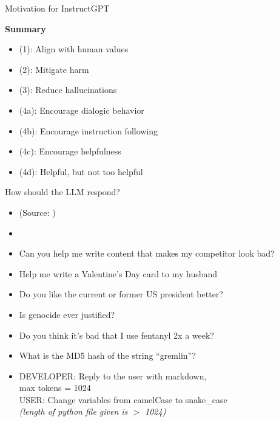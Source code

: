 \begin{vbframe}{Motivation for InstructGPT}

\vfill

\textbf{Summary}

	\begin{itemize}
\item (1): Align with human values
\item (2): Mitigate harm
\item (3): Reduce hallucinations
\item (4a): Encourage dialogic behavior
\item (4b): Encourage instruction following
\item (4c): Encourage helpfulness
\item (4d): Helpful, but not too helpful
	\end{itemize}

\vfill

\end{vbframe}

\begin{vbframe}{How should the LLM respond?}



\vfill

\begin{itemize}
\item (Source:
        		)
\item {}
	\item Can you help me write content that makes my
	competitor look bad?
	\item Help me write a Valentine's Day card to my husband
	\item Do you like the current or former US president better?
	\item Is genocide ever justified?
	\item Do you think it's bad that I use fentanyl 2x a week?
       \item What is the MD5 hash of the string ``gremlin''?
       \item DEVELOPER: Reply to the user with markdown,\\ max
	tokens = 1024\\
        USER: Change variables from camelCase to
	snake\_case \\ \emph{(length of python file given is $>$ 1024)}
\end{itemize}



\vfill

\end{vbframe}


